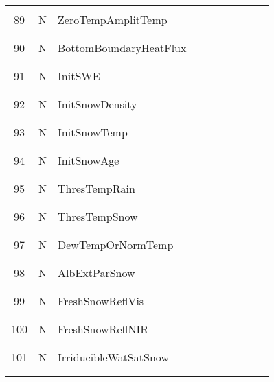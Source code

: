 \begin{longtable}{|c|c|l|c|c|c|c|p{}|c|p{}|}
&&&&&&&&&\\\hline%
&&&&&&&&&\\
89 & N & ZeroTempAmplitTemp & & & & & & & \\
&&&&&&&&&\\\hline%
&&&&&&&&&\\
90 & N & BottomBoundaryHeatFlux & & & & & & & \\
&&&&&&&&&\\\hline%
&&&&&&&&&\\
91 & N & InitSWE & & & & & & & \\
&&&&&&&&&\\\hline%
&&&&&&&&&\\
92 & N & InitSnowDensity & & & & & & & \\
&&&&&&&&&\\\hline%
&&&&&&&&&\\
93 & N & InitSnowTemp & & & & & & & \\
&&&&&&&&&\\\hline%
&&&&&&&&&\\
94 & N & InitSnowAge & & & & & & & \\
&&&&&&&&&\\\hline%
&&&&&&&&&\\
95 & N & ThresTempRain & & & & & & & \\
&&&&&&&&&\\\hline%
&&&&&&&&&\\
96 & N & ThresTempSnow & & & & & & & \\
&&&&&&&&&\\\hline%
&&&&&&&&&\\
97 & N & DewTempOrNormTemp & & & & & & & \\
&&&&&&&&&\\\hline%
&&&&&&&&&\\
98 & N & AlbExtParSnow & & & & & & & \\
&&&&&&&&&\\\hline%
&&&&&&&&&\\
99 & N & FreshSnowReflVis & & & & & & & \\
&&&&&&&&&\\\hline%
&&&&&&&&&\\
100 & N & FreshSnowReflNIR & & & & & & & \\
&&&&&&&&&\\\hline%
&&&&&&&&&\\
101 & N & IrriducibleWatSatSnow & & & & & & & \\
&&&&&&&&&\\\hline%
&&&&&&&&&\\

\end{longtable}
